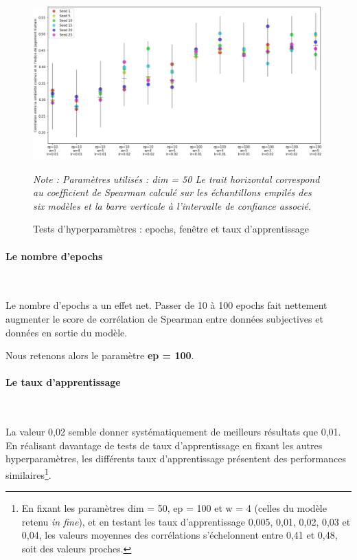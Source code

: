 \documentclass[11pt,french,french]{article}
\let\rmarkdownfootnote\footnote%
\def\footnote{\protect\rmarkdownfootnote}
\begin{document}
\begin{figure}
\begin{center}
\includegraphics[width=1\textwidth]{img/test_parametres.png}
\captionsetup{margin=0cm,format=hang,justification=justified}
\caption{Tests d'hyperparamètres : epochs, fenêtre et taux d'apprentissage}\label{fig:evaluation_1}
\end{center}
\vspace{-0.3cm}
\footnotesize
\emph{Note : Paramètres utilisés : dim = 50\newline
Le trait horizontal correspond au coefficient de Spearman calculé sur les échantillons empilés des six modèles et la barre verticale à l'intervalle de confiance associé.}
\end{figure}

\hypertarget{le-nombre-depochs}{%
\paragraph{Le nombre d'epochs}\label{le-nombre-depochs}}

~

Le nombre d'epochs a un effet net. Passer de 10 à 100 epochs fait nettement augmenter le score de corrélation de Spearman entre données subjectives et données en sortie du modèle.

\faArrowCircleRight{} Nous retenons alors le paramètre \textbf{ep = 100}.

\hypertarget{le-taux-dapprentissage}{%
\paragraph{Le taux d'apprentissage}\label{le-taux-dapprentissage}}

~

La valeur 0,02 semble donner systématiquement de meilleurs résultats que 0,01. En réalisant davantage de tests de taux d'apprentissage en fixant les autres hyperparamètres, les différents taux d'apprentissage présentent des performances similaires\footnote{En fixant les paramètres dim = 50, ep = 100 et w = 4 (celles du modèle retenu \emph{in fine}), et en testant les taux d'apprentissage 0,005, 0,01, 0,02, 0,03 et 0,04, les valeurs moyennes des corrélations s'échelonnent entre 0,41 et 0,48, soit des valeurs proches.}.
\end{document}
